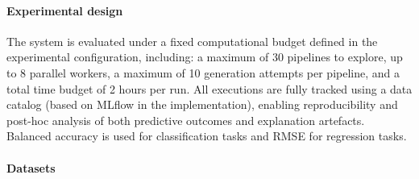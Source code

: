 \documentclass[runningheads]{llncs}
\newenvironment{inlinelist}{\begin{enumerate*}[label=\emph{(\roman*)}]}{\end{enumerate*}}
\newcommand{\ourapproach}[0]{\textsc{AGE-ML}}
\begin{document}
\paragraph{Experimental design}
\label{subsec:experimental-design}


%
%
The system is evaluated under a fixed computational budget defined in the experimental configuration, including:
a maximum of 30 pipelines to explore,
up to 8 parallel workers,
a maximum of 10 generation attempts per pipeline,
and a total time budget of 2 hours per run.
%
All executions are fully tracked using a data catalog (based on MLflow in the implementation),
enabling reproducibility and post-hoc analysis of both predictive outcomes and explanation artefacts.
Balanced accuracy is used for classification tasks and RMSE for regression tasks.

\paragraph{Datasets}
\label{subsubsec:datasets}


\end{document}

